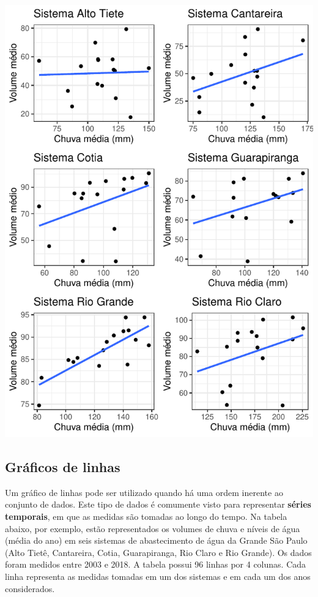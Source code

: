 \documentclass[
]{book}
\begin{document}
\begin{center}\includegraphics{probest-cambientais_files/figure-latex/unnamed-chunk-28-1} \end{center}

\hypertarget{gruxe1ficos-de-linhas}{%
\subsection{Gráficos de linhas}\label{gruxe1ficos-de-linhas}}

Um gráfico de linhas pode ser utilizado quando há uma ordem inerente ao conjunto de dados. Este tipo de dados é comumente visto para representar \textbf{séries temporais}, em que as medidas são tomadas ao longo do tempo. Na tabela abaixo, por exemplo, estão representados os volumes de chuva e níveis de água (média do ano) em seis sistemas de abastecimento de água da Grande São Paulo (Alto Tietê, Cantareira, Cotia, Guarapiranga, Rio Claro e Rio Grande). Os dados foram medidos entre 2003 e 2018. A tabela possui 96 linhas por 4 colunas. Cada linha representa as medidas tomadas em um dos sistemas e em cada um dos anos considerados.
\end{document}
